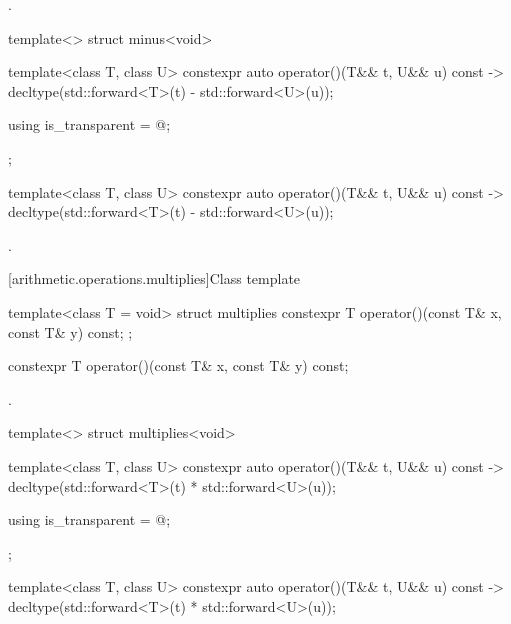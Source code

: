 \begin{itemdescr}
\pnum
\returns
{}.
\end{itemdescr}

%
\begin{itemdecl}
template<> struct minus<void> {
  template<class T, class U> constexpr auto operator()(T&& t, U&& u) const
    -> decltype(std::forward<T>(t) - std::forward<U>(u));

  using is_transparent = @\unspec@;
};
\end{itemdecl}

%
\begin{itemdecl}
template<class T, class U> constexpr auto operator()(T&& t, U&& u) const
    -> decltype(std::forward<T>(t) - std::forward<U>(u));
\end{itemdecl}

\begin{itemdescr}
\pnum
\returns
{}.
\end{itemdescr}

[arithmetic.operations.multiplies]{Class template }

%
\begin{itemdecl}
template<class T = void> struct multiplies {
  constexpr T operator()(const T& x, const T& y) const;
};
\end{itemdecl}

%
\begin{itemdecl}
constexpr T operator()(const T& x, const T& y) const;
\end{itemdecl}

\begin{itemdescr}
\pnum
\returns
{}.
\end{itemdescr}

%
\begin{itemdecl}
template<> struct multiplies<void> {
  template<class T, class U> constexpr auto operator()(T&& t, U&& u) const
    -> decltype(std::forward<T>(t) * std::forward<U>(u));

  using is_transparent = @\unspec@;
};
\end{itemdecl}

%
\begin{itemdecl}
template<class T, class U> constexpr auto operator()(T&& t, U&& u) const
    -> decltype(std::forward<T>(t) * std::forward<U>(u));
\end{itemdecl}


